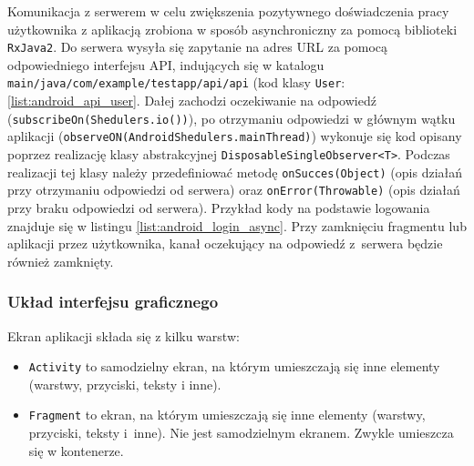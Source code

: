 \label{text:android_api_service}
Komunikacja z serwerem w celu zwiększenia pozytywnego doświadczenia pracy użytkownika z aplikacją zrobiona w sposób asynchroniczny za pomocą biblioteki \texttt{RxJava2}.
Do serwera wysyła się zapytanie na adres URL za pomocą odpowiedniego interfejsu API, indujących się w katalogu \texttt{main/java/com/example/testapp/api/api} (kod klasy \texttt{User}: \ref{list:android_api_user}.
Dałej zachodzi oczekiwanie na odpowiedź (\texttt{subscribeOn(Shedulers.io())}), po otrzymaniu odpowiedzi w głównym wątku aplikacji (\texttt{observeON(AndroidShedulers.mainThread)}) wykonuje się kod opisany poprzez realizację klasy abstrakcyjnej \texttt{DisposableSingleObserver<T>}. Podczas realizacji tej klasy należy przedefiniować metodę \texttt{onSucces(Object)} (opis działań przy otrzymaniu odpowiedzi od serwera) oraz \texttt{onError(Throwable)} (opis działań przy braku odpowiedzi od serwera).
Przykład kody na podstawie logowania znajduje się w listingu \ref{list:android_login_async}. Przy zamknięciu fragmentu lub aplikacji przez użytkownika, kanał oczekujący na odpowiedź z~serwera będzie również zamknięty.
\subsubsection{Układ interfejsu graficznego}
Ekran aplikacji składa się z kilku warstw:
\begin{itemize}
    \item \texttt{Activity} to samodzielny ekran, na którym umieszczają się inne elementy (warstwy, przyciski, teksty i inne).
    \item \texttt{Fragment} to ekran, na którym umieszczają się inne elementy (warstwy, przyciski, teksty i~inne). Nie jest samodzielnym ekranem. Zwykle umieszcza się w kontenerze.
\end{itemize}

